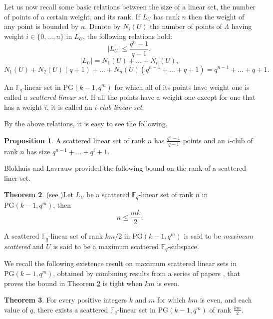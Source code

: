 \documentclass[11pt]{amsart}
\theoremstyle{definition}
\newtheorem{theorem}{Theorem}[section]
\newtheorem{proposition}[theorem]{Proposition}
\newcommand{\fq}{{\mathbb F}_{q}}
\newcommand{\PG}{\mathrm{PG}}
\begin{document}
Let us now recall some basic relations between the size of a linear set, the number of points of a certain weight, and its rank.
If $L_U$ has rank $n$ then the weight of any point is bounded by $n$. Denote by $N_i(U)$ the number of points of $\Lambda$ having weight $i\in \{0,\ldots,n\}$ in $L_U$, the following relations hold:
\begin{equation}\label{eq:card}
    |L_U| \leq \frac{q^n-1}{q-1},
\end{equation}
\begin{equation}\label{eq:pesicard}
    |L_U| =N_1(U)+\ldots+N_n(U),
\end{equation}
\begin{equation}\label{eq:pesivett}
    N_1(U)+N_2(U)(q+1)+\ldots+N_n(U)(q^{n-1}+\ldots+q+1)=q^{n-1}+\ldots+q+1.
\end{equation}

An $\fq$-linear set in $\PG(k-1,q^m)$ for which all of its points have weight one is called a \emph{scattered linear set}. If all the points have a weight one except for one that has a weight $i$, it is called an $i$-\emph{club linear set}.

By the above relations, it is easy to see the following.

\begin{proposition}\label{prop:size}
A scattered linear set of rank $n$ has $\frac{q^n-1}{q-1}$ points and an $i$-club of rank $n$ has size $q^{n-1}+\ldots+q^i+1$.
\end{proposition}

Blokhuis and Lavrauw provided the following bound on the rank of a scattered liner set.

\begin{theorem}(see \cite{blokhuis2000scattered})\label{th:rankMaxScattered}
Let $L_U$ be a scattered $\fq$-linear set of rank $n$ in $\PG(k-1,q^m)$, then
\[ n\leq \frac{mk}2. \]
\end{theorem}

A scattered $\fq$-linear set of rank $km/2$ in $\PG(k-1,q^m)$ is said to be \emph{maximum scattered} and $U$ is said to be a maximum scattered $\fq$-subspace.

We recall the following existence result on maximum scattered linear sets in $\PG(k-1,q^m)$, obtained by combining results from a series of papers \cite{blokhuis2000scattered,ball2000linear,bartoli2018maximum,csajbok2017maximum}, that proves the bound in Theorem \ref{th:rankMaxScattered} is tight when $km$ is even.

\begin{theorem}\label{th:existencescattered}
For every positive integers $k$ and $m$ for which $km$ is even, and each value of $q$, there exists a scattered $\fq$-linear set in $\mathrm{PG}(k-1,q^m)$ of rank $\frac{km}2$. 
\end{theorem}
\end{document}
